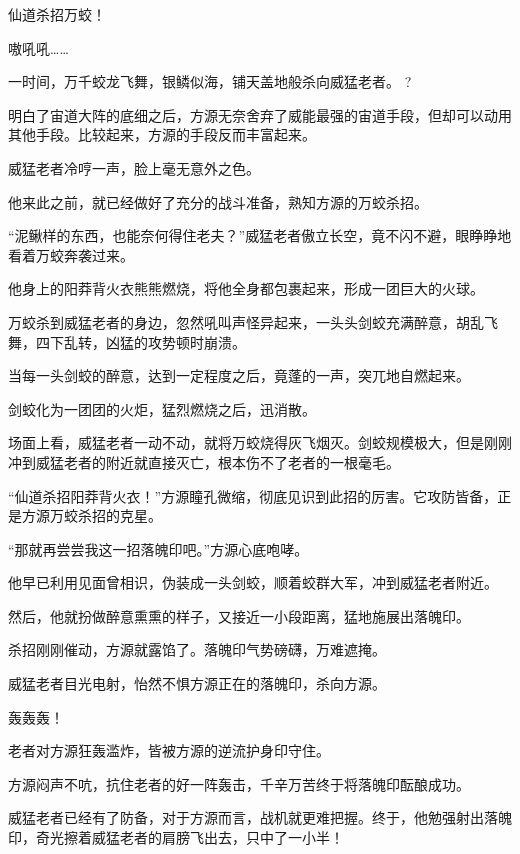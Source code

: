 
\begin{this_body}

仙道杀招万蛟！

嗷吼吼……

一时间，万千蛟龙飞舞，银鳞似海，铺天盖地般杀向威猛老者。 ?

明白了宙道大阵的底细之后，方源无奈舍弃了威能最强的宙道手段，但却可以动用其他手段。比较起来，方源的手段反而丰富起来。

威猛老者冷哼一声，脸上毫无意外之色。

他来此之前，就已经做好了充分的战斗准备，熟知方源的万蛟杀招。

“泥鳅样的东西，也能奈何得住老夫？”威猛老者傲立长空，竟不闪不避，眼睁睁地看着万蛟奔袭过来。

他身上的阳莽背火衣熊熊燃烧，将他全身都包裹起来，形成一团巨大的火球。

万蛟杀到威猛老者的身边，忽然吼叫声怪异起来，一头头剑蛟充满醉意，胡乱飞舞，四下乱转，凶猛的攻势顿时崩溃。

当每一头剑蛟的醉意，达到一定程度之后，竟蓬的一声，突兀地自燃起来。

剑蛟化为一团团的火炬，猛烈燃烧之后，迅消散。

场面上看，威猛老者一动不动，就将万蛟烧得灰飞烟灭。剑蛟规模极大，但是刚刚冲到威猛老者的附近就直接灭亡，根本伤不了老者的一根毫毛。

“仙道杀招阳莽背火衣！”方源瞳孔微缩，彻底见识到此招的厉害。它攻防皆备，正是方源万蛟杀招的克星。

“那就再尝尝我这一招落魄印吧。”方源心底咆哮。

他早已利用见面曾相识，伪装成一头剑蛟，顺着蛟群大军，冲到威猛老者附近。

然后，他就扮做醉意熏熏的样子，又接近一小段距离，猛地施展出落魄印。

杀招刚刚催动，方源就露馅了。落魄印气势磅礴，万难遮掩。

威猛老者目光电射，怡然不惧方源正在的落魄印，杀向方源。

轰轰轰！

老者对方源狂轰滥炸，皆被方源的逆流护身印守住。

方源闷声不吭，抗住老者的好一阵轰击，千辛万苦终于将落魄印酝酿成功。

威猛老者已经有了防备，对于方源而言，战机就更难把握。终于，他勉强射出落魄印，奇光擦着威猛老者的肩膀飞出去，只中了一小半！


\end{this_body}
